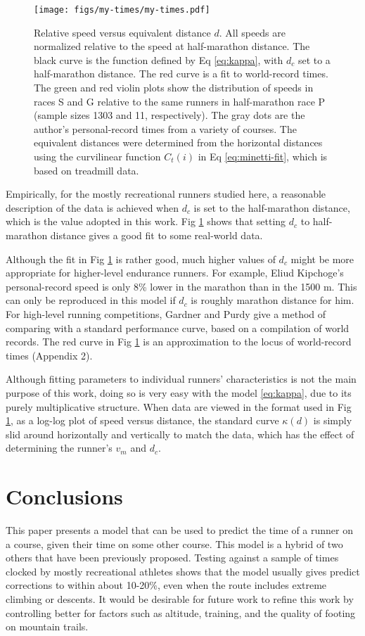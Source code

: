 \documentclass[10pt,letterpaper]{article}
\begin{document}
\begin{figure}[h]
\texttt{[image: figs/my-times/my-times.pdf]}
\centering
\caption{Relative speed versus equivalent distance $d$. All speeds are normalized relative to the speed at half-marathon distance.
The black curve is the function defined by Eq \ref{eq:kappa}, with $d_c$ set to a half-marathon distance.
The red curve is a 
fit to world-record times.\cite{cameron} 
The green and red violin plots show the distribution of speeds in races S and G relative to the same runners
in half-marathon race P (sample sizes 1303 and 11, respectively).
The gray dots are the author's personal-record times from a variety of courses.
The equivalent distances were determined from the horizontal distances using the curvilinear
function $C_t(i)$ in Eq \ref{eq:minetti-fit}, which is based on treadmill data. }
\label{fig:my-times}
\end{figure}

Empirically, for the mostly recreational runners studied here, a reasonable description of the data is achieved when
$d_c$ is set to the half-marathon distance, which is the value adopted in this work.
Fig \ref{fig:my-times} shows that
setting $d_c$ to half-marathon distance gives a good fit to some real-world data.

Although the fit in Fig \ref{fig:my-times} is rather good,
much higher values of $d_c$ might be more appropriate for higher-level endurance runners.
For example, Eliud Kipchoge's personal-record
speed is only 8\% lower in the marathon than in the 1500 m. This can only be reproduced in this model if $d_c$
is roughly marathon distance for him.
For high-level running competitions, Gardner and Purdy give a
method of comparing with a standard performance curve, based on a compilation of world
records.\cite{gardner} 
The red curve in Fig \ref{fig:my-times} is an approximation to the locus of world-record times (Appendix 2).

Although fitting parameters to individual runners' characteristics is not the main purpose of this work, doing
so is very easy with the model \ref{eq:kappa}, due to its purely multiplicative structure.
When data are viewed in the format used in Fig \ref{fig:my-times}, as a log-log plot of speed versus distance,
the standard curve $\kappa(d)$ is simply slid around horizontally and vertically to match the data, which
has the effect of determining the runner's $v_m$ and $d_c$.

\section{Conclusions}
This paper presents a model that can be used to predict the time of a runner on a
course, given their time on some other course. This model is a hybrid of two others that have been previously
proposed. Testing against a sample of times
clocked by mostly recreational athletes shows that
the model usually gives predict corrections
to within about 10-20\%, even when the route includes extreme climbing or descents.
It would be desirable for future work to refine this work by controlling better for factors such
as altitude, training, and the quality of footing on mountain trails.
\end{document}
